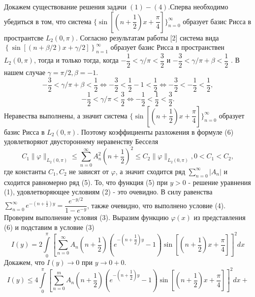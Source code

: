 \documentclass[12pt, a4paper]{article}
\begin{document}
	
	Докажем существование решения задачи $(1) - (4)$.Сперва необходимо убедиться в том, что система  $\{\sin{\left[\left(n + \dfrac12\right)x + \dfrac\pi4\right]}\}_{n=0}^{\infty}$ образует базис Рисса в пространтсве $L_2(0, \pi)$. Согласно результатам работы [2] система вида  $\left\{\sin\left[\left(n+\beta/2\right)x + \gamma/2\right]\right\}_{n=1}^{\infty}$ образует базис Рисса в пространствен $L_2(0,\pi)$, тогда и только тогда, когда  $-\dfrac12 < \gamma/\pi < \dfrac32$ и $-\dfrac32 < \gamma/\pi + \beta < \dfrac12$ . В нашем случае $\gamma = \pi/2, \beta = -1$.
	\begin{equation*}
		-\dfrac32 < \gamma/\pi + \beta < \dfrac12 \Leftrightarrow -\dfrac32 < \dfrac12 - 1 < \dfrac12 \Leftrightarrow  -\dfrac32 < -\dfrac12 < \dfrac12,
	\end{equation*}	
	\begin{equation*}
		-\dfrac12 < \gamma/\pi < \dfrac32 \Leftrightarrow 	-\dfrac12 < \dfrac12 < \dfrac32.
	\end{equation*}
	Неравества выполнены, а значит система $\{\sin{\left[\left(n + \dfrac12\right)x + \dfrac\pi4\right]}\}_{n=0}^{\infty}$ образует базис Рисса в $L_2(0, \pi)$. Поэтому коэффициенты разложения в формуле (6) удовлетворяют двустороннему неравенству Бесселя
	\begin{equation*}
		C_1 \|\varphi \|_{L_2(0,\pi)} \leq \sum\limits_{n=0}^{\infty} A_n^2 \left(n + \dfrac12\right)^2 \leq C_2 \|\varphi \|_{L_2(0,\pi)} , 0 < C_1 < C_2, 
	\end{equation*}
	где константы $C_1, C_2$ не зависят от $\varphi$, 
	а значит сходится ряд $\sum\limits_{n=0}^{\infty} |A_n|$ и сходится равномерно ряд (5). То, что функция (5) при $y > 0$ - решение уравнения (1), удовлетворяющее условиям (2) - это очевидно. В силу равенства $\sum\limits_{n=0}^{\infty} e^{-\left(n + \frac12\right)y} = \dfrac{e^{-y/2}}{1 - e^{-y}}$, также очевидно, что выполнено условие (4). Проверим выполнение условия (3).\newline
	Выразим функцию $\varphi(x)$ из представления (6) и подставим в условие (3)
	\begin{equation*}
		I(y) =  2 \int\limits_0^\pi \left[	\sum\limits_{n=0}^{\infty} A_n\left(n+\dfrac12\right) \left( e^{-\left(n+\dfrac12\right)y} - 1\right) \sin{\left[\left(n+\dfrac12\right) x  + \dfrac\pi4\right]} \right]^2 dx
	\end{equation*}
	Докажем, что $I(y) \to 0$ при $y \to 0+0$. 
	\begin{equation*}
		I(y) \leq 4\int\limits_0^\pi \left[	\sum\limits_{n=0}^{m} A_n\left(n+\dfrac12\right) \left( e^{-\left(n+\dfrac12\right)y} - 1\right) \sin{\left[\left(n+\dfrac12\right) x  + \dfrac\pi4\right]} \right]^2 dx + 
	\end{equation*}
\end{document}
